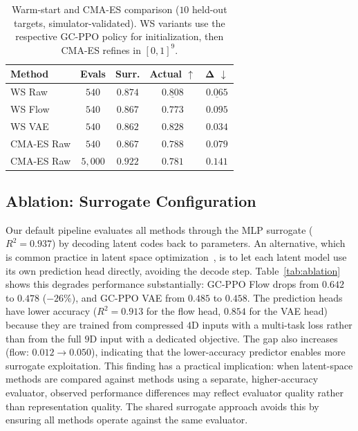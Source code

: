 \begin{table}[t]
\centering
\caption{Warm-start and CMA-ES comparison ($10$ held-out targets, simulator-validated). WS variants use the respective GC-PPO policy for initialization, then CMA-ES refines in $[0,1]^9$.}
\label{tab:warmstart}
\small
\begin{tabular}{lcccc}
\toprule
\textbf{Method} & \textbf{Evals} & \textbf{Surr.} & \textbf{Actual} $\uparrow$ & $\boldsymbol{\Delta}$ $\downarrow$ \\
\midrule
WS Raw & $540$ & $0.874$ & $\underline{0.808}$ & $\underline{0.065}$ \\
WS Flow & $540$ & $0.867$ & $0.773$ & $0.095$ \\
WS VAE & $540$ & $0.862$ & $\mathbf{0.828}$ & $\mathbf{0.034}$ \\
\midrule
CMA-ES Raw & $540$ & $0.867$ & $0.788$ & $0.079$ \\
CMA-ES Raw & $5{,}000$ & $0.922$ & $0.781$ & $0.141$ \\
\bottomrule
\end{tabular}
\end{table}

\subsection{Ablation: Surrogate Configuration}
\label{sec:ablation}

Our default pipeline evaluates all methods through the MLP surrogate ($R^2{=}0.937$) by decoding latent codes back to parameters. An alternative, which is common practice in latent space optimization~\cite{gomez2018automatic, maus2022lolbo, lee2025nfbo}, is to let each latent model use its own prediction head directly, avoiding the decode step. Table~\ref{tab:ablation} shows this degrades performance substantially: GC-PPO Flow drops from $0.642$ to $0.478$ ($-26\%$), and GC-PPO VAE from $0.485$ to $0.458$. The prediction heads have lower accuracy ($R^2{=}0.913$ for the flow head, $0.854$ for the VAE head) because they are trained from compressed $4$D inputs with a multi-task loss rather than from the full $9$D input with a dedicated objective. The gap also increases (flow: $0.012 \to 0.050$), indicating that the lower-accuracy predictor enables more surrogate exploitation. This finding has a practical implication: when latent-space methods are compared against methods using a separate, higher-accuracy evaluator, observed performance differences may reflect evaluator quality rather than representation quality. The shared surrogate approach avoids this by ensuring all methods operate against the same evaluator.

